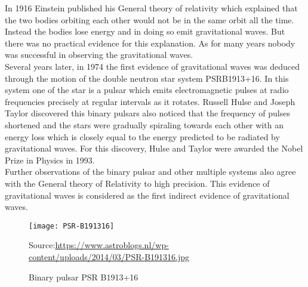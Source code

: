 \documentclass[11pt,a4paper]{article}
\begin{document}
In 1916 Einstein published his General theory of relativity which explained that the two bodies orbiting each other would not be in the same orbit all the time. Instead the bodies lose energy and in doing so emit gravitational waves. But there was no practical evidence for this explanation. As for many years nobody was successful in observing the gravitational waves.\\


Several years later, in 1974\cite{Ligo} the first evidence of gravitational waves was deduced through the motion of the double neutron star system PSRB1913+16. In this system one of the star is a pulsar which emits electromagnetic pulses at radio frequencies precisely at regular intervals as it rotates. Russell Hulse and Joseph Taylor discovered this binary pulsars also noticed that the frequency of pulses shortened and the stars were gradually spiraling towards each other with an energy loss which is closely equal to the energy predicted to be radiated by gravitational waves. For this discovery, Hulse and Taylor were awarded the Nobel Prize in Physics in 1993.\cite{Lommen_2015}\\


 Further observations of the binary pulsar and other multiple systems also agree with the General theory of Relativity to high precision. This evidence of gravitational waves is considered as the first indirect evidence of gravitational waves. 
 
 
 
 
 \begin{figure}[htp]
    \centering
    \texttt{[image: PSR-B191316]}
    \caption{Binary pulsar PSR B1913+16}
    Source:\url{https://www.astroblogs.nl/wp-content/uploads/2014/03/PSR-B191316.jpg}
    \label{fig:pulsar}
    
\end{figure}


 
 
 
 
 
 
 
 
 
 
 
 
 
 \printbibliography
  
\end{document}
